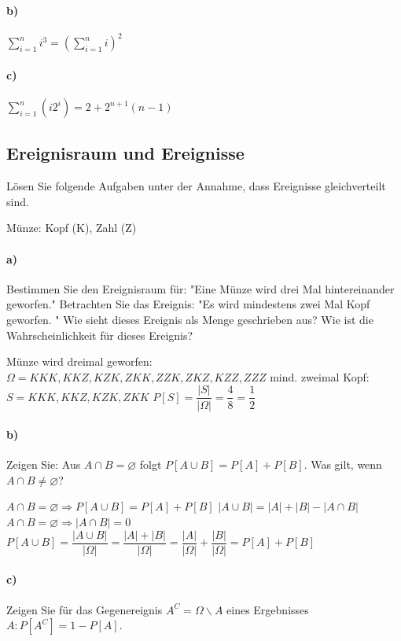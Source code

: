 \documentclass[paper=a4, fontsize=11pt]{scrartcl}
\numberwithin{equation}{section}
\numberwithin{figure}{section}
\numberwithin{table}{section}
\begin{document}
\paragraph{b)}
$\sum^{n}_{i=1} i^{3} = (\sum^{n}_{i=1} i)^{2}$

\paragraph{c)}
$\sum^{n}_{i=1} (i 2^{i}) = 2 + 2^{n+1} (n-1)$

\subsection{Ereignisraum und Ereignisse}
Lösen Sie folgende Aufgaben unter der Annahme, dass Ereignisse gleichverteilt sind.

Münze: Kopf (K), Zahl (Z)

\paragraph{a)}
Bestimmen Sie den Ereignisraum für: "Eine Münze wird drei Mal hintereinander geworfen." Betrachten Sie das Ereignis: "Es wird mindestens zwei Mal Kopf geworfen. " Wie sieht dieses Ereignis als Menge geschrieben aus? Wie ist die Wahrscheinlichkeit für dieses Ereignis?

Münze wird dreimal geworfen: $\Omega = {KKK, KKZ, KZK,ZKK,ZZK,ZKZ,KZZ,ZZZ}$
mind. zweimal Kopf: $S = {KKK,KKZ,KZK,ZKK}$
$P[S]= \dfrac{|S|}{| \Omega|} = \dfrac{4}{8} = \dfrac{1}{2}$

\paragraph{b)}
Zeigen Sie: Aus $A\cap B =\varnothing$ folgt $P[A \cup B] = P[A] + P[B]$. Was gilt, wenn $A \cap B \neq \varnothing$?

$A \cap B = \varnothing \Rightarrow P[A \cup B] = P[A] + P[B]$
$|A \cup B| = |A| + |B| - |A \cap B|$
$A \cap B = \varnothing \Rightarrow |A \cap B| = 0$
$P[A \cup B] = \dfrac{|A \cup B|}{| \Omega|} = \dfrac{|A|+|B|}{| \Omega|} = \dfrac{|A|}{| \Omega|}+ \dfrac{|B|}{| \Omega|} = P[A] + P[B]$

\paragraph{c)}
Zeigen Sie für das Gegenereignis $A^{C}= \Omega \backslash A$ eines Ergebnisses $A: P [A^{C}] = 1-P[A]$.
\end{document}

